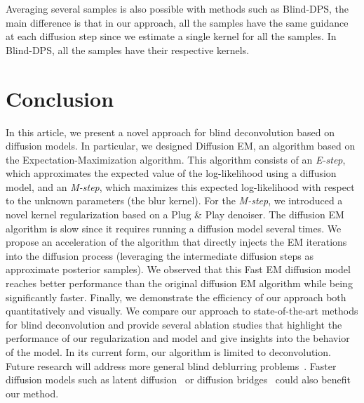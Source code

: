 \documentclass[10pt,twocolumn,letterpaper]{article}
\begin{document}
%
Averaging several samples is also possible with methods such as Blind-DPS, the main difference is that in our approach, all the samples have the same guidance at each diffusion step since we estimate a single kernel for all the samples. In Blind-DPS, all the samples have their respective kernels.


\section{Conclusion}

In this article, we present a novel approach for blind deconvolution based on diffusion models. 
%
In particular, we designed Diffusion EM, an algorithm based on the Expectation-Maximization algorithm. This algorithm consists of an \textit{E-step}, which approximates the expected value of the log-likelihood using a diffusion model, and an \textit{M-step}, which maximizes this expected log-likelihood with respect to the unknown parameters (the blur kernel).
%
For the \textit{M-step}, we introduced a novel kernel regularization based on a Plug \& Play denoiser. 
%
The diffusion EM algorithm is slow since it requires running a diffusion model several times. We propose an acceleration of the algorithm that directly injects the EM iterations into the diffusion process (leveraging the intermediate diffusion steps as approximate posterior samples). We observed that this Fast EM diffusion model reaches better performance than the original diffusion EM algorithm while being significantly faster.
%
Finally, we demonstrate the efficiency of our approach both quantitatively and visually. We compare our approach to state-of-the-art methods for blind deconvolution and provide several ablation studies that highlight the performance of our regularization and model and give insights into the behavior of the model.
%
In its current form, our algorithm is limited to deconvolution. Future research will address more general blind deblurring problems~\cite{Debarnot2022,Carbajal2023}.
Faster diffusion models such as latent diffusion~\cite{Rombach_2022_CVPR,Chung2023a} or diffusion bridges~\cite{liu2023i2sb} could also benefit our method.


{\small


}

\end{document}
